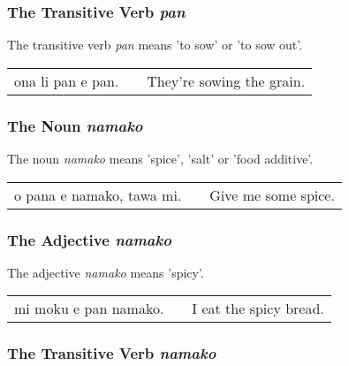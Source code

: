 %
%
\subsubsection*{The Transitive Verb \textit{pan}}
%

The transitive verb \textit{pan} means 'to sow' or 'to sow out'.

\begin{supertabular}{p{5,5cm}|ll}
ona li pan e pan. && They're sowing the grain. \\
\end{supertabular} 

%
%
\subsubsection*{The Noun \textit{namako}}
%

The noun \textit{namako} means 'spice', 'salt' or 'food additive'.

\begin{supertabular}{p{5,5cm}|ll}
o pana e namako, tawa mi. &&  Give me some spice. \\
\end{supertabular} 

%
%
\subsubsection*{The Adjective \textit{namako}}
%

The adjective \textit{namako} means 'spicy'. 

\begin{supertabular}{p{5,5cm}|ll}
mi moku e pan namako. && I eat the spicy bread. \\
\end{supertabular}

%
%
\subsubsection*{The Transitive Verb \textit{namako}}
%

